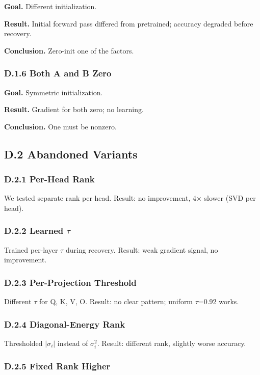\textbf{Goal.} Different initialization.

\textbf{Result.} Initial forward pass differed from pretrained; accuracy 
degraded before recovery.

\textbf{Conclusion.} Zero-init one of the factors.

\subsubsection{D.1.6 Both A and B Zero}

\textbf{Goal.} Symmetric initialization.

\textbf{Result.} Gradient for both zero; no learning.

\textbf{Conclusion.} One must be nonzero.

\subsection{D.2 Abandoned Variants}

\subsubsection{D.2.1 Per-Head Rank}

We tested separate rank per head. Result: no improvement, 4$\times$ slower 
(SVD per head).

\subsubsection{D.2.2 Learned $\tau$}

Trained per-layer $\tau$ during recovery. Result: weak gradient signal, no 
improvement.

\subsubsection{D.2.3 Per-Projection Threshold}

Different $\tau$ for Q, K, V, O. Result: no clear pattern; uniform $\tau$=0.92 
works.

\subsubsection{D.2.4 Diagonal-Energy Rank}

Thresholded $|\sigma_i|$ instead of $\sigma_i^2$. Result: different rank, 
slightly worse accuracy.

\subsubsection{D.2.5 Fixed Rank Higher}

